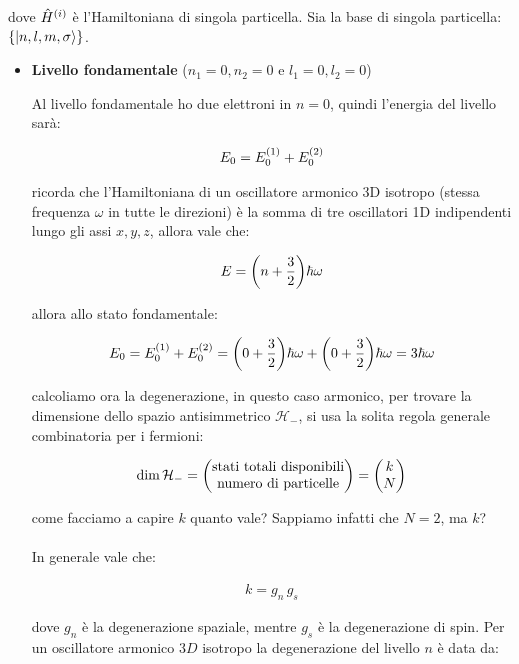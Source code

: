 	dove $\hat{H}^{\qty(i)}$ è l'Hamiltoniana di singola particella. Sia la base di singola particella: $\qty{\ket{n, l, m, \sigma}}$.
	
\begin{itemize}
	
	\item \textbf{Livello fondamentale} ($n_1 = 0, n_2 = 0$ e $l_1 = 0, l_2 = 0$)
	
		Al livello fondamentale ho due elettroni in $n = 0$, quindi l'energia del livello sarà:
		
	\begin{align*}
		E_0 = E_{0}^{\qty(1)} + E_0^{\qty(2)}  
	\end{align*}
	
		ricorda che l'Hamiltoniana di un oscillatore armonico 3D isotropo (stessa frequenza $\omega$ in tutte le direzioni) è la somma di tre oscillatori 1D indipendenti lungo gli assi $x, y, z$, allora vale che:
	
	\begin{align*}
		E = \qty(n + \frac{3}{2}) \hbar \omega
	\end{align*}
		
		allora allo stato fondamentale:

	\begin{align*}
		E_0 = E_{0}^{\qty(1)} + E_0^{\qty(2)}  = \qty(0 + \frac{3}{2}) \hbar \omega + \qty(0 + \frac{3}{2}) \hbar \omega = 3 \hbar \omega
	\end{align*}

		calcoliamo ora la degenerazione, in questo caso armonico, per trovare la dimensione dello spazio antisimmetrico $\mathcal{H}_-$, si usa la solita regola generale combinatoria per i fermioni:
		
	\begin{align*}
		\text{dim} \, \mathcal{H}_- = \mqty(\text{stati totali disponibili} \\ \text{numero di particelle}) = \mqty(k \\ N)
	\end{align*}

		come facciamo a capire $k$ quanto vale? Sappiamo infatti che $N = 2$, ma $k$?
		\\
		\\
		In generale vale che:
		
	\begin{align*}
		k = g_n \, g_s
	\end{align*}
	
		dove $g_n$ è la degenerazione spaziale, mentre $g_s$ è la degenerazione di spin. Per un oscillatore armonico $3D$ isotropo la degenerazione del livello $n$ è data da:
		

\end{itemize}
